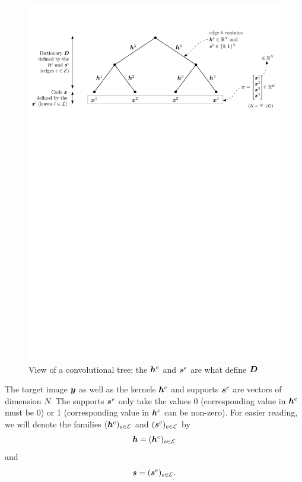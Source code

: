 \begin{figure}[!ht]\centering
\includegraphics[width=\textwidth]{figures/tree.pdf}
\caption{View of a convolutional tree; the $\bm{h}^e$ and $\bm{s}^e$ are what define $\bm{D}$}\label{fig_tree}
\end{figure}

\noindent
The target image $\bm{y}$ as well as the kernels $\bm{h}^e$ and supports $\bm{s}^e$ are vectors of dimension $N$. The supports $\bm{s}^e$ only take the values 0 (corresponding value in $\bm{h}^e$ must be 0) or 1 (corresponding value in $\bm{h}^e$ can be non-zero). For easier reading, we will denote the families $(\bm{h}^e)_{e \in \mathcal E}$ and $(\bm{s}^e)_{e \in \mathcal E}$ by \begin{equation*}\bm{h} = (\bm{h}^e)_{e \in \mathcal E}\end{equation*} and \begin{equation*}\bm{s} = (\bm{s}^e)_{e \in \mathcal E}.\end{equation*}

